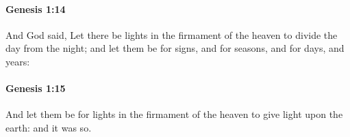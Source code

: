 		\paragraph{Genesis 1:14} %
			\label{GENESIS-1-14}

			And God said, Let there be lights in the firmament of the heaven to divide the day from the night; and let them be for signs, and for seasons, and for days, and years:


		\paragraph{Genesis 1:15} %
			\label{GENESIS-1-15}

			And let them be for lights in the firmament of the heaven to give light upon the earth: and it was so.


